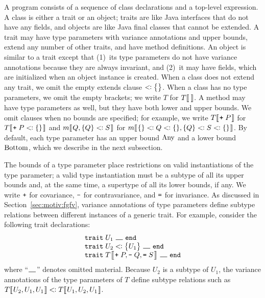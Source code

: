 A program consists of a sequence of class declarations and
a top-level expression.
A class is either a trait or an object;
traits are like Java interfaces that do not have any fields, and
objects are like Java final classes that cannot be extended.
A trait may have type parameters with variance annotations and
upper bounds, extend any number of other traits, and have method definitions.
An object is similar to a trait except that (1)~its type parameters do
not have variance annotations because they are always invariant, and
(2)~it may have fields, which are initialized when an object instance is
created.  When a class does not extend any trait, we omit the
empty extends clause $\extends \bigbd{}$.
When a class has no type parameters, we omit the
empty brackets; we write $T$ for $T\ob{}$.
A method may have type parameters as well, but they have both
lower and upper bounds.
We omit clauses when no bounds are specified; for example,
we write $T\ob{\bindco \; P}$ for $T\ob{\bindco \; \bindup{P}{}}$ and
$m\ob{Q,\bd{Q} \extends S}$ for $m\ob{\lobindup{}{Q}{}, \lobindup{Q}{S}{}}$.
By default, each type parameter has an upper bound $\mathord{\mathrm{Any}}$ and a
lower bound $\mathord{\mathrm{Bottom}}$, which we describe in the next subsection.

The bounds of a type parameter place restrictions on valid instantiations
of the type parameter; a valid type instantiation must be a subtype of
all its upper bounds and, at the same time, a supertype of
all its lower bounds, if any.
We write $\hbox{\tt +}$ for covariance, $\hbox{\tt -}$ for
contravariance, and $\hbox{\tt =}$ for invariance.  As discussed in
Section~\ref{sec:motiv:fgfv}, variance annotations of type parameters define
subtype relations between different instances of a generic trait.
For example, consider the following trait declarations:\\[-.5em]
\[
\begin{array}{l}
\kwd{trait} \; U_1 \; \dontcares \; \kwd{end}\\
\kwd{trait} \; U_2 \extends \bigbd{U_1} \; \dontcares \; \kwd{end}\\
\kwd{trait} \; T \bigob{\bindco \; P, \bindcontra \; Q, \bindinv \; S} \;
\dontcares \; \kwd{end}
\end{array}
\]
where ``$\dontcares$'' denotes omitted material.
Because $U_2$ is a subtype of $U_1$,
the variance annotations of the type parameters of $T$ define
subtype relations such as $T\ob{U_2, U_1, U_1} \subtypeof T\ob{U_1, U_2, U_1}$.

